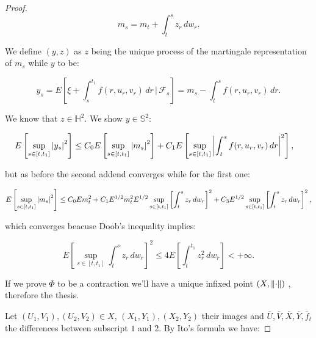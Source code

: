 \begin{theorem}
\begin{proof}
        \begin{equation}
            m_s = m_t + \int_t^{s} z_r\,dw_r.
        \end{equation}

        We define $(y,z)$ as $z$ being the unique process of the martingale representation of $m_s$ while $y$ to be:

        \begin{equation}
            y_s = E\left[\xi + \int_s^{t_1} f(r,u_r,v_r)\,dr\,|\,\mathcal{F}_s\right] = m_s - \int_t^s f(r,u_r,v_r)\,dr.
        \end{equation}

        We know that $z\in\mathbb{H}^2$. We show $y\in\mathbb{S}^2$:

        \begin{align}
            E\left[\sup_{s\in[t,t_1]}\abs{y_s}^2\right] & \leq C_0E\left[\sup_{s\in[t,t_1]}\abs{m_s}^2\right] + C_1E\left[\sup_{s\in[t,t_1]}\abs{\int_t^s f(r,u_r,v_r)\,dr}^2\right],
        \end{align}

        but as before the second addend converges while for the first one:

        \[E\left[\sup_{s\in[t,t_1]}\abs{m_s}^2\right] \leq C_0 Em_t^2 + C_1E^{1/2}m_t^2E^{1/2}\sup_{s\in[t,t_1]}\left[\int_t^{s}z_r\,dw_r\right]^2+C_3E^{1/2}\sup_{s\in[t,t_1]}\left[\int_t^{s}z_r\,dw_r\right]^2,\]

        which converges beacuse Doob's inequality implies:

        \[E\left[\sup_{s\in[t,t_1]}\int_t^sz_r\,dw_r\right]^2 \leq 4E\left[\int_t^{t_1}z_r^2\,dw_r\right]<+\infty.\]

        If we prove $\Phi$ to be a contraction we'll have a unique infixed point $(X,\norm{\cdot})$ , therefore the thesis. 
        
        Let $(U_1,V_1),(U_2,V_2)\in X$, $(X_1,Y_1),(X_2,Y_2)$ their images and $\overline{U},\overline{V},\overline{X},\overline{Y},\overline{f}_t$ the differences between subscript $1$ and $2$. 
        By Ito's formula we have:


\end{proof}
\end{theorem}
